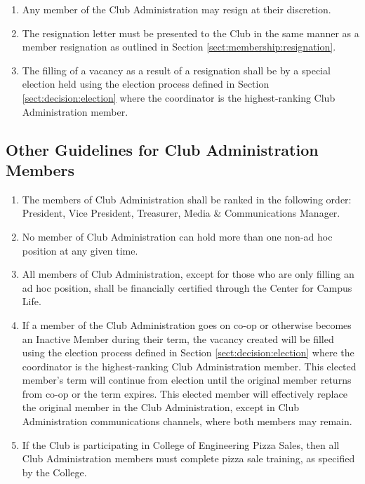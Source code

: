 \documentclass[english,11pt]{article}
\begin{document}
\begin{enumerate}[label=\alph*.]
    \item Any member of the Club Administration may resign at their discretion.
    \item The resignation letter must be presented to the Club in the same manner as a member resignation as outlined in Section \ref{sect:membership:resignation}.
    \item The filling of a vacancy as a result of a resignation shall be by a special election held using the election process defined in Section \ref{sect:decision:election} where the coordinator is the highest-ranking Club Administration member.
\end{enumerate}

\subsection{Other Guidelines for Club Administration Members} \label{subsect:cadmin:other}

\begin{enumerate}[label=\Alph*.]
    \item The members of Club Administration shall be ranked in the following order: President, Vice President, Treasurer, Media \& Communications Manager.
    \item No member of Club Administration can hold more than one non-ad hoc position at any given time.
    \item All members of Club Administration, except for those who are only filling an ad hoc position, shall be financially certified through the Center for Campus Life.
    \item If a member of the Club Administration goes on co-op or otherwise becomes an Inactive Member during their term, the vacancy created will be filled using the election process defined in Section \ref{sect:decision:election} where the coordinator is the highest-ranking Club Administration member.
          This elected member's term will continue from election until the original member returns from co-op or the term expires.
          This elected member will effectively replace the original member in the Club Administration, except in Club Administration communications channels, where both members may remain.
    \item If the Club is participating in College of Engineering Pizza Sales, then all Club Administration members must complete pizza sale training, as specified by the College.
\end{enumerate}
\end{document}
